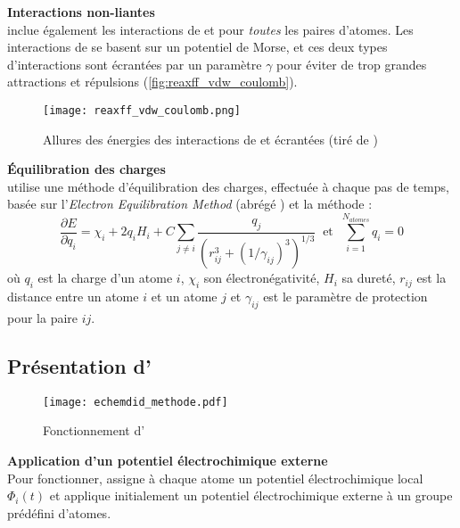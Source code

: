 \textbf{Interactions non-liantes}\\
\reaxff{} inclue également les interactions de \vdw{} et \coulomb{} pour \emph{toutes} les paires d'atomes. Les interactions de \vdw{} se basent sur un potentiel de Morse, et ces deux types d'interactions sont écrantées par un paramètre $\gamma$ pour éviter de trop grandes attractions et répulsions (\autoref{fig:reaxff_vdw_coulomb}).

\begin{figure}[h!]
    \centering
    \texttt{[image: reaxff\_vdw\_coulomb.png]}
    \caption{Allures des énergies des interactions de \vdw{} et \coulomb{} écrantées {\tiny (tiré de \cite{russo_atomistic-scale_2011})}}
    \label{fig:reaxff_vdw_coulomb}
\end{figure}

\textbf{Équilibration des charges}\\
\reaxff{} utilise une méthode d'équilibration des charges, effectuée à chaque pas de temps, basée sur l'\emph{Electron Equilibration Method} (abrégé \eem{})\cite{mortier_electronegativity-equalization_2002} et la méthode \qeq{}\cite{rappe_charge_1991} :
\begin{equation}
    \boxed%
    {
    \frac{\partial E}{\partial q_i} = \chi_i + 2 q_i H_i + C \sum_{j \neq i} \frac{q_j}{\left(r_{ij}^3 + (1 / \gamma_{ij})^3\right)^{1/3}}
    }
    \ \text{ et } \ 
    \boxed%
    {
        \sum_{i = 1}^{N_{atomes}} q_i = 0
    }
\end{equation}
où $q_i$ est la charge d'un atome $i$, $\chi_i$ son électronégativité, $H_i$ sa dureté, $r_{ij}$ est la distance entre un atome $i$ et un atome $j$ et $\gamma_{ij}$ est le paramètre de protection pour la paire $ij$.


    \subsection{Présentation d'\echemdid{}} \label{sec:echemdid}

\begin{figure}[h!]
    \centering
    \texttt{[image: echemdid\_methode.pdf]}
    \caption{Fonctionnement d'\echemdid{}}
    \label{fig:echemdid_fonctionnement}
\end{figure}

\textbf{Application d'un potentiel électrochimique externe}\\
Pour fonctionner, \echemdid{} assigne à chaque atome un potentiel électrochimique local $\Phi_i (t)$ et applique initialement un potentiel électrochimique externe à un groupe prédéfini d'atomes.

